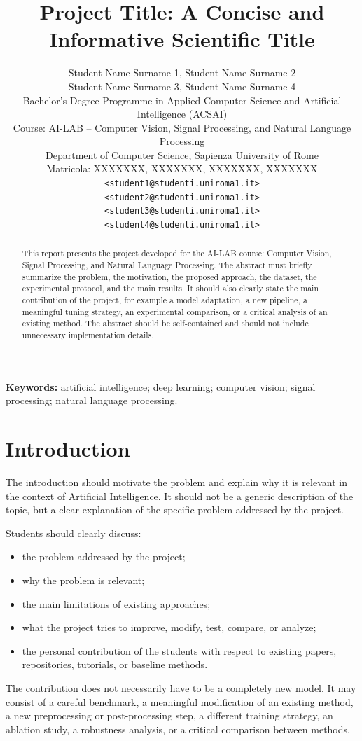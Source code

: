 \documentclass[10pt,twocolumn,a4paper]{article}
\title{\textbf{Project Title: A Concise and Informative Scientific Title}}
\author{
 Student Name Surname 1, Student Name Surname 2\\
 Student Name Surname 3, Student Name Surname 4\\
 Bachelor's Degree Programme in Applied Computer Science and Artificial Intelligence (ACSAI)\\
 Course: AI-LAB -- Computer Vision, Signal Processing, and Natural Language Processing\\
 Department of Computer Science, Sapienza University of Rome\\
 Matricola: XXXXXXX, XXXXXXX, XXXXXXX, XXXXXXX\\
 \texttt{<student1@studenti.uniroma1.it>}\\
 \texttt{<student2@studenti.uniroma1.it>}\\
 \texttt{<student3@studenti.uniroma1.it>}\\
 \texttt{<student4@studenti.uniroma1.it>}
}
\date{}
\begin{document}
 
 \maketitle
 
 \begin{abstract}
  This report presents the project developed for the AI-LAB course: Computer Vision, Signal Processing, and Natural Language Processing. The abstract must briefly summarize the problem, the motivation, the proposed approach, the dataset, the experimental protocol, and the main results. It should also clearly state the main contribution of the project, for example a model adaptation, a new pipeline, a meaningful tuning strategy, an experimental comparison, or a critical analysis of an existing method. The abstract should be self-contained and should not include unnecessary implementation details.
 \end{abstract}
 
 \noindent\textbf{Keywords:} artificial intelligence; deep learning; computer vision; signal processing; natural language processing.
 
 \section{Introduction}
 
 The introduction should motivate the problem and explain why it is relevant in the context of Artificial Intelligence. It should not be a generic description of the topic, but a clear explanation of the specific problem addressed by the project.
 
 Students should clearly discuss:
 \begin{itemize}
  \item the problem addressed by the project;
  \item why the problem is relevant;
  \item the main limitations of existing approaches;
  \item what the project tries to improve, modify, test, compare, or analyze;
  \item the personal contribution of the students with respect to existing papers, repositories, tutorials, or baseline methods.
 \end{itemize}
 
 The contribution does not necessarily have to be a completely new model. It may consist of a careful benchmark, a meaningful modification of an existing method, a new preprocessing or post-processing step, a different training strategy, an ablation study, a robustness analysis, or a critical comparison between methods.
 
\end{document}
